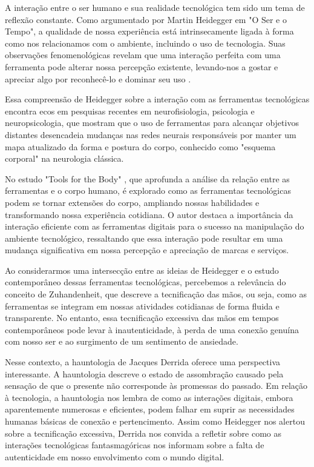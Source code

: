 A interação entre o ser humano e sua realidade tecnológica tem sido um tema de reflexão constante. Como argumentado por Martin Heidegger em "O Ser e o Tempo", a qualidade de nossa experiência está intrinsecamente ligada à forma como nos relacionamos com o ambiente, incluindo o uso de tecnologia. Suas observações fenomenológicas revelam que uma interação perfeita com uma ferramenta pode alterar nossa percepção existente, levando-nos a gostar e apreciar algo por reconhecê-lo e dominar seu uso \cite{2012_Silva_DISSERTATION}.

Essa compreensão de Heidegger sobre a interação com as ferramentas tecnológicas encontra ecos em pesquisas recentes em neurofisiologia, psicologia e neuropsicologia, que mostram que o uso de ferramentas para alcançar objetivos distantes desencadeia mudanças nas redes neurais responsáveis por manter um mapa atualizado da forma e postura do corpo, conhecido como "esquema corporal" na neurologia clássica. 

No estudo "Tools for the Body" \cite{2004_Maravita}, que aprofunda a análise da relação entre as ferramentas e o corpo humano, é explorado como as ferramentas tecnológicas podem se tornar extensões do corpo, ampliando nossas habilidades e transformando nossa experiência cotidiana. O autor destaca a importância da interação eficiente com as ferramentas digitais para o sucesso na manipulação do ambiente tecnológico, ressaltando que essa interação pode resultar em uma mudança significativa em nossa percepção e apreciação de marcas e serviços.

Ao considerarmos uma intersecção entre as ideias de Heidegger e o estudo contemporâneo dessas ferramentas tecnológicas, percebemos a relevância do conceito de Zuhandenheit, que descreve a tecnificação das mãos, ou seja, como as ferramentas se integram em nossas atividades cotidianas de forma fluida e transparente. No entanto, essa tecnificação excessiva das mãos em tempos contemporâneos pode levar à inautenticidade, à perda de uma conexão genuína com nosso ser e ao surgimento de um sentimento de ansiedade.

Nesse contexto, a hauntologia de Jacques Derrida oferece uma perspectiva interessante. A hauntologia descreve o estado de assombração causado pela sensação de que o presente não corresponde às promessas do passado. Em relação à tecnologia, a hauntologia nos lembra de como as interações digitais, embora aparentemente numerosas e eficientes, podem falhar em suprir as necessidades humanas básicas de conexão e pertencimento. Assim como Heidegger nos alertou sobre a tecnificação excessiva, Derrida nos convida a refletir sobre como as interações tecnológicas fantasmagóricas nos informam sobre a falta de autenticidade em nosso envolvimento com o mundo digital.

